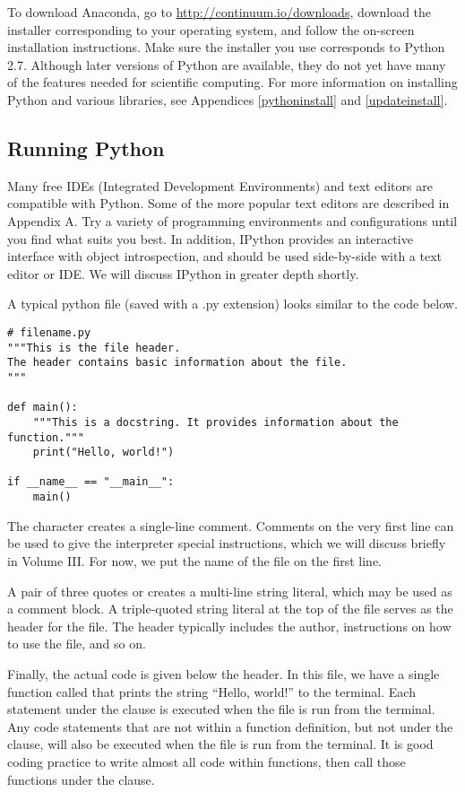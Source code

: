 To download Anaconda, go to \url{http://continuum.io/downloads}, download the installer corresponding to your operating system, and follow the on-screen installation instructions. 
Make sure the installer you use corresponds to Python 2.7.
Although later versions of Python are available, they do not yet have many of the features needed for scientific computing. %
For more information on installing Python and various libraries, see Appendices \ref{pythoninstall} and \ref{updateinstall}.

\subsection*{Running Python}

Many free IDEs (Integrated Development Environments) and text editors are compatible with Python.
Some of the more popular text editors are described in Appendix A.
Try a variety of programming environments and configurations until you find what suits you best.
In addition, IPython provides an interactive interface with object introspection, and should be used side-by-side with a text editor or IDE.
We will discuss IPython in greater depth shortly.

A typical python file (saved with a .py extension) looks similar to the code below.

\begin{lstlisting}
# filename.py
"""This is the file header.
The header contains basic information about the file.
"""

def main():
    """This is a docstring. It provides information about the function."""
    print("Hello, world!")

if __name__ == "__main__":
    main()
\end{lstlisting}

The \li{#} character creates a single-line comment.
Comments on the very first line can be used to give the interpreter special instructions, which we will discuss briefly in Volume III.
For now, we put the name of the file on the first line. 

A pair of three quotes  or  creates a multi-line string literal, which may be used as a comment block.
A triple-quoted string literal at the top of the file serves as the header for the file.
The header typically includes the author, instructions on how to use the file, and so on.

Finally, the actual code is given below the header.
In this file, we have a single function called  that prints the string ``Hello, world!'' to the terminal.
Each statement under the  clause is executed when the file is run from the terminal.
Any code statements that are not within a function definition, but not under the  clause, will also be executed when the file is run from the terminal.
It is good coding practice to write almost all code within functions, then call those functions under the  clause.

